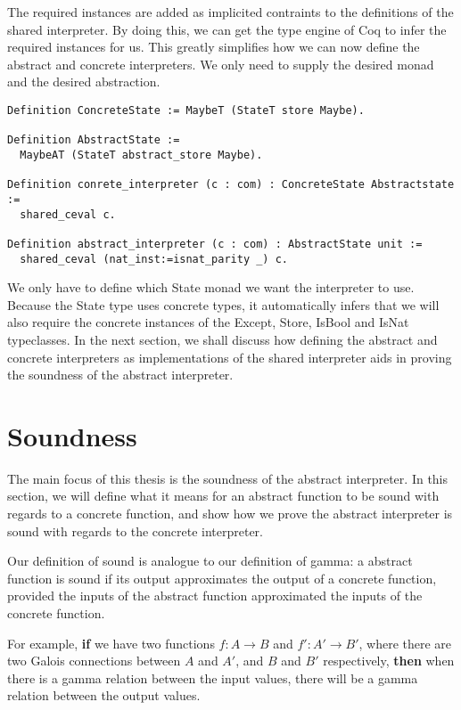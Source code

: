 The required instances are added as implicited contraints to the definitions of
the shared interpreter. By doing this, we can get the type engine of Coq to
infer the required instances for us. This greatly simplifies how we can now
define the abstract and concrete interpreters. We only need to supply the
desired monad and the desired abstraction.

\begin{verbatim}
Definition ConcreteState := MaybeT (StateT store Maybe).

Definition AbstractState := 
  MaybeAT (StateT abstract_store Maybe).

Definition conrete_interpreter (c : com) : ConcreteState Abstractstate :=
  shared_ceval c.

Definition abstract_interpreter (c : com) : AbstractState unit :=
  shared_ceval (nat_inst:=isnat_parity _) c.
\end{verbatim}

We only have to define which State monad we want the interpreter to use.
Because the State type uses concrete types, it automatically infers that we
will also require the concrete instances of the Except, Store, IsBool and IsNat
typeclasses. In the next section, we shall discuss how defining the abstract
and concrete interpreters as implementations of the shared interpreter aids in
proving the soundness of the abstract interpreter.

\section{Soundness}\label{sec:soundness}
The main focus of this thesis is the soundness of the abstract interpreter. In
this section, we will define what it means for an abstract function to be sound
with regards to a concrete function, and show how we prove the abstract 
interpreter is sound with regards to the concrete interpreter. 

Our definition of sound is analogue to our definition of gamma: a abstract 
function is sound if its output approximates the output of a concrete function,
provided the inputs of the abstract function approximated the inputs of the
concrete function.

For example, \textbf{if} we have two functions $f : A \rightarrow B$ and $f' 
: A' \rightarrow B'$, where there are two Galois connections 
between $A$ and $A'$, and $B$ and $B'$ respectively, \textbf{then} when 
there is a gamma relation between the input values, there will be a gamma
relation between the output values.

